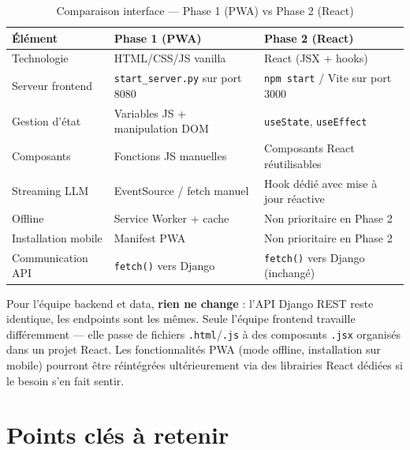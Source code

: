 \documentclass[11pt,a4paper]{article}
\begin{document}
\begin{table}[H]
\centering
\begin{tabularx}{\textwidth}{|l|X|X|}
\hline
\textbf{Élément} & \textbf{Phase 1 (PWA)} & \textbf{Phase 2 (React)} \\
\hline
Technologie & HTML/CSS/JS vanilla & React (JSX + hooks) \\
\hline
Serveur frontend & \texttt{start\_server.py} sur port 8080 & \texttt{npm start} / Vite sur port 3000 \\
\hline
Gestion d'état & Variables JS + manipulation DOM & \texttt{useState}, \texttt{useEffect} \\
\hline
Composants & Fonctions JS manuelles & Composants React réutilisables \\
\hline
Streaming LLM & EventSource / fetch manuel & Hook dédié avec mise à jour réactive \\
\hline
Offline & Service Worker + cache & Non prioritaire en Phase 2 \\
\hline
Installation mobile & Manifest PWA & Non prioritaire en Phase 2 \\
\hline
Communication API & \texttt{fetch()} vers Django & \texttt{fetch()} vers Django (inchangé) \\
\hline
\end{tabularx}
\caption{Comparaison interface --- Phase 1 (PWA) vs Phase 2 (React)}
\end{table}

\begin{astuce}
Pour l'équipe backend et data, \textbf{rien ne change} : l'API
Django REST reste identique, les endpoints sont les mêmes. Seule
l'équipe frontend travaille différemment --- elle passe de fichiers
\texttt{.html}/\texttt{.js} à des composants \texttt{.jsx} organisés
dans un projet React. Les fonctionnalités PWA (mode offline,
installation sur mobile) pourront être réintégrées ultérieurement
via des librairies React dédiées si le besoin s'en fait sentir.
\end{astuce}

\clearpage

\section{Points clés à retenir}
\end{document}
